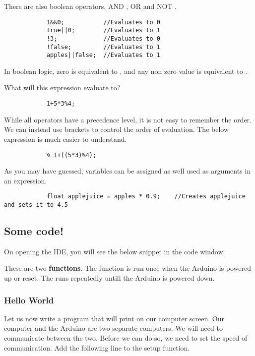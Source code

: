 \documentclass{article}
\begin{document}
			There are also boolean operators, AND \inlncd{\&\&}, OR \inlncd{||} and NOT \inlncd{!}.

			\begin{lstlisting}
			1&&0;			//Evaluates to 0
			true||0;		//Evaluates to 1
			!3;				//Evaluates to 0
			!false;			//Evaluates to 1
			apples||false;	//Evaluates to 1
			\end{lstlisting}

			In boolean logic, zero is equivalent to , and any non zero value is equivalent to .

			What will this expression evaluate to?

			\begin{lstlisting}
			1+5*3%4;
			\end{lstlisting}

			While all operators have a precedence level, it is not easy to remember the order. We can instead use brackets to control the order of evaluation. The below expression is much easier to understand.

			\begin{lstlisting}
			% 1+((5*3)%4);
			\end{lstlisting}

			As you may have guessed, variables can be assigned as well used as arguments in an expression.

			\begin{lstlisting}
			float applejuice = apples * 0.9;	//Creates applejuice and sets it to 4.5
			\end{lstlisting}

	\subsection{Some code!}

		On opening the IDE, you will see the below snippet in the code window:

		

		These are two \textbf{functions}. The  function is run once when the Arduino is powered up or reset. The  runs repeatedly untill the Arduino is powered down.

		\subsubsection{Hello World}
			Let us now write a program that will print  on our computer screen. Our computer and the Arduino are two separate computers. We will need to communicate between the two. Before we can do so, we need to set the speed of communication. Add the following line to the setup function.
\end{document}
